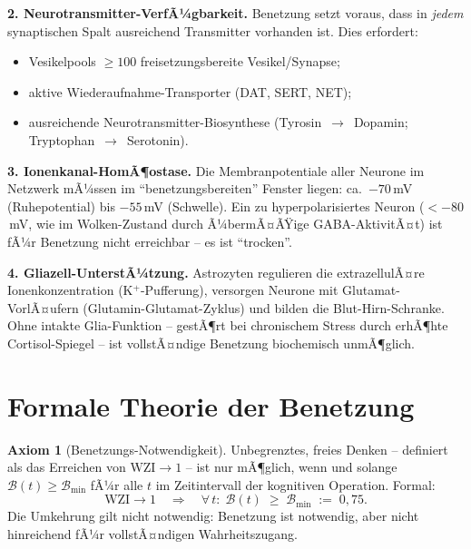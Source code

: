 ﻿\documentclass[12pt,a4paper]{report}
\theoremstyle{plain}
\theoremstyle{definition}
\newtheorem{axiom}[theorem]{Axiom}
\theoremstyle{remark}
\begin{document}
	\textbf{2. Neurotransmitter-VerfÃ¼gbarkeit.}
	Benetzung setzt voraus, dass in \emph{jedem} synaptischen Spalt
	ausreichend Transmitter vorhanden ist. Dies erfordert:
	\begin{itemize}
		\item Vesikelpools $\geq 100$ freisetzungsbereite Vesikel/Synapse;
		\item aktive Wiederaufnahme-Transporter (DAT, SERT, NET);
		\item ausreichende Neurotransmitter-Biosynthese
		(Tyrosin~$\to$~Dopamin; Tryptophan~$\to$~Serotonin).
	\end{itemize}

	\textbf{3. Ionenkanal-HomÃ¶ostase.}
	Die Membranpotentiale aller Neurone im Netzwerk mÃ¼ssen im
	``benetzungsbereiten'' Fenster liegen: ca.\ $-70$\,mV (Ruhepotential)
	bis $-55$\,mV (Schwelle). Ein zu hyperpolarisiertes Neuron
	($< -80$\,mV, wie im Wolken-Zustand durch Ã¼bermÃ¤ÃŸige GABA-AktivitÃ¤t)
	ist fÃ¼r Benetzung nicht erreichbar -- es ist ``trocken''.

	\textbf{4. Gliazell-UnterstÃ¼tzung.}
	Astrozyten regulieren die extrazellulÃ¤re Ionenkonzentration
	(K$^+$-Pufferung), versorgen Neurone mit Glutamat-VorlÃ¤ufern
	(Glutamin-Glutamat-Zyklus) und bilden die Blut-Hirn-Schranke.
	Ohne intakte Glia-Funktion -- gestÃ¶rt bei chronischem Stress
	durch erhÃ¶hte Cortisol-Spiegel -- ist vollstÃ¤ndige Benetzung
	biochemisch unmÃ¶glich.

	\section{Formale Theorie der Benetzung}

	\begin{axiom}[Benetzungs-Notwendigkeit]
		\label{axiom:benetzung}
		Unbegrenztes, freies Denken -- definiert als das Erreichen von
		$\mathrm{WZI} \to 1$ -- ist nur mÃ¶glich, wenn und solange
		$\mathcal{B}(t) \geq \mathcal{B}_{\min}$ fÃ¼r alle $t$ im
		Zeitintervall der kognitiven Operation.
		Formal:
		\[
		\mathrm{WZI} \to 1
		\quad\Rightarrow\quad
		\forall\,t:\; \mathcal{B}(t) \;\geq\; \mathcal{B}_{\min} \;:=\; 0{,}75.
		\]
		Die Umkehrung gilt nicht notwendig: Benetzung ist notwendig,
		aber nicht hinreichend fÃ¼r vollstÃ¤ndigen Wahrheitszugang.
	\end{axiom}
\end{document}
